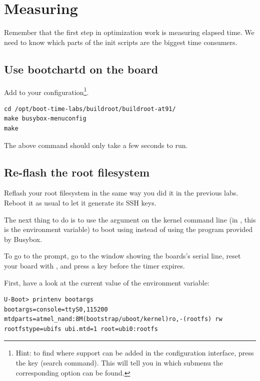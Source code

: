 
\section{Measuring}

Remember that the first step in optimization work is measuring elapsed
time. We need to know which parts of the init scripts are the biggest
time consumers.

\subsection{Use bootchartd on the board}

Add  to your  configuration\footnote{
Hint: to find where  support can be
added in the  configuration interface, press the \code{/}
key (search command). This will tell you in which submenu the
corresponding option can be found.}.

\begin{verbatim}
cd /opt/boot-time-labs/buildroot/buildroot-at91/
make busybox-menuconfig
make
\end{verbatim}

The above command should only take a few seconds to run.

\subsection{Re-flash the root filesystem}

Reflash your root filesystem in the same way you did it in the previous
labs. Reboot it as usual to let it generate its SSH keys.

The next thing to do is to use the  argument on the
kernel command line (in , this is the 
environment variable) to boot using  instead of using
the  program provided by Busybox.

To go to the  prompt, go to the  window
showing the boards's serial line, reset your board with , and
press a key before the timer expires.

First, have a look at the current value of the 
environment variable:

\begin{verbatim}
U-Boot> printenv bootargs
bootargs=console=ttyS0,115200
mtdparts=atmel_nand:8M(bootstrap/uboot/kernel)ro,-(rootfs) rw
rootfstype=ubifs ubi.mtd=1 root=ubi0:rootfs
\end{verbatim}

